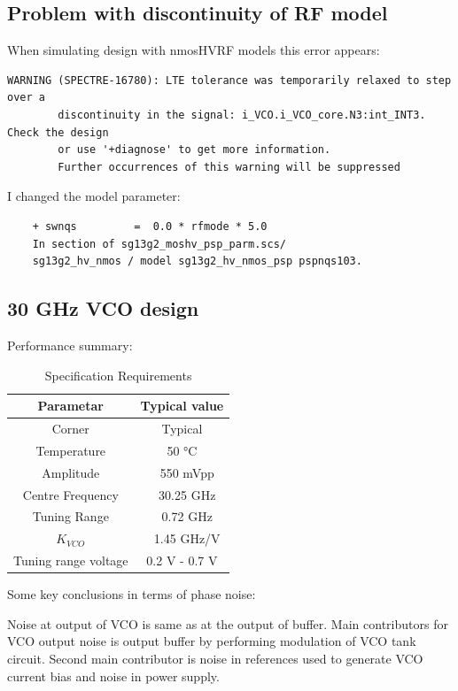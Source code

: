 \documentclass{article}
\begin{document}
\subsection{Problem with discontinuity of RF model}

When simulating design with nmosHVRF models this error appears:

\begin{verbatim}
WARNING (SPECTRE-16780): LTE tolerance was temporarily relaxed to step over a 
		discontinuity in the signal: i_VCO.i_VCO_core.N3:int_INT3. Check the design 
		or use '+diagnose' to get more information.
        Further occurrences of this warning will be suppressed
\end{verbatim}

I changed the model parameter:
\begin{verbatim}
	+ swnqs         =  0.0 * rfmode * 5.0
	In section of sg13g2_moshv_psp_parm.scs/ 
	sg13g2_hv_nmos / model sg13g2_hv_nmos_psp pspnqs103.		
\end{verbatim}

\subsection{30 GHz VCO design}


Performance summary:
\begin{table}[ht]
	\centering
	\begin{tabular}{|c|c|}
		\hline
		Parametar & Typical value \\
		\hline
		Corner & Typical \\
		\hline
		Temperature & 50 °C \\
		\hline
		Amplitude & ~ 550 mVpp \\
		\hline
		Centre Frequency & ~ 30.25 GHz \\
		\hline
		Tuning Range & ~ 0.72 GHz \\
		\hline
		$K_{VCO}$ & ~ 1.45 GHz/V \\
		\hline
		Tuning range voltage & 0.2 V - 0.7 V \\
		\hline
	\end{tabular}
	\label{30GHz-VCO-design}
	\caption{Specification Requirements} 
\end{table}

Some key conclusions in terms of phase noise:

Noise at output of VCO is same as at the output of buffer. Main contributors for VCO output noise is output buffer by performing modulation of VCO tank circuit. Second main contributor is noise in references used to generate VCO current bias and noise in power supply.
\end{document}
